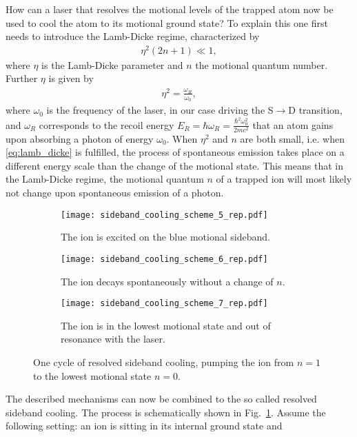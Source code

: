 How can a laser that resolves the motional levels of the trapped atom now be
used to cool the atom to its motional ground state? To explain this one first
needs to introduce the Lamb-Dicke regime, characterized by
\begin{align}
  \label{eq:lamb_dicke}
  \eta ^{2}(2n+1)\ll 1,
\end{align}
where $\eta$ is the Lamb-Dicke parameter and $n$ the motional quantum number.
Further $\eta$ is given by
\begin{align}
  \label{eq:def_eta}
  \eta^2 = \frac{\omega_R}{\omega_0},
\end{align}
where $\omega_0$ is the frequency of the laser, in our case driving the
S$\rightarrow$D transition, and $\omega_R$ corresponds to the recoil energy $E_R
= \hbar \omega_R = \frac{\hbar^2\omega_0^2}{2mc^2}$ that an atom gains upon
absorbing a photon of energy $\omega_0$. When $\eta^2$ and $n$ are both small,
i.e. when \eqref{eq:lamb_dicke} is fulfilled, the process of
spontaneous emission takes place on a different energy scale than the change of
the motional state. This means that in the Lamb-Dicke regime, the motional
quantum $n$ of a trapped ion will most likely not change upon spontaneous
emission of a photon.
\begin{figure}[t]
  \centering
  \begin{subfigure}[t]{0.33\linewidth}
    \centering
    \texttt{[image: sideband\_cooling\_scheme\_5\_rep.pdf]}
    \caption{The ion is excited on the blue motional sideband.}
  \end{subfigure}
  \begin{subfigure}[t]{0.3\linewidth}
    \centering
    \texttt{[image: sideband\_cooling\_scheme\_6\_rep.pdf]}
    \caption{The ion decays spontaneously without a change of $n$.}
  \end{subfigure}
  \begin{subfigure}[t]{0.3\linewidth}
    \centering
    \texttt{[image: sideband\_cooling\_scheme\_7\_rep.pdf]}
    \caption{The ion is in the lowest motional state and out of resonance with
    the laser.}
  \end{subfigure}
  \caption{One cycle of resolved sideband cooling, pumping the ion from $n=1$ to
  the lowest motional state $n=0$.}
  \label{fig:sideband_cooling}
\end{figure}
The described mechanisms can now be combined to the so called resolved sideband
cooling. The process is schematically shown in Fig.~\ref{fig:sideband_cooling}.
Assume the following setting: an ion is sitting in its internal ground state and
